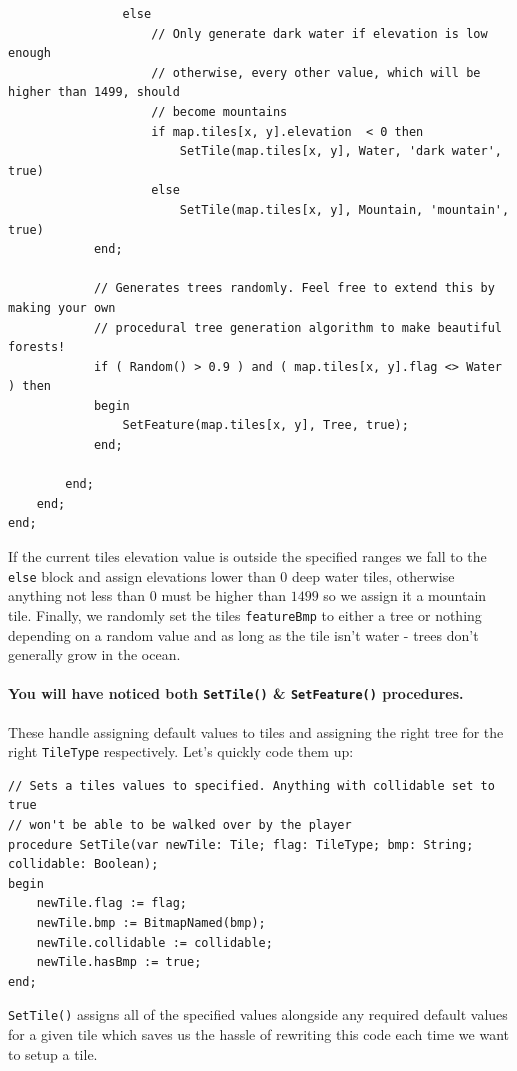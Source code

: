 \documentclass{article}
\begin{document}
\begin{verbatim}
				else
					// Only generate dark water if elevation is low enough
					// otherwise, every other value, which will be higher than 1499, should
					// become mountains
					if map.tiles[x, y].elevation  < 0 then
						SetTile(map.tiles[x, y], Water, 'dark water', true)
					else
						SetTile(map.tiles[x, y], Mountain, 'mountain', true)
			end;

			// Generates trees randomly. Feel free to extend this by making your own
			// procedural tree generation algorithm to make beautiful forests!
			if ( Random() > 0.9 ) and ( map.tiles[x, y].flag <> Water ) then
			begin
				SetFeature(map.tiles[x, y], Tree, true);
			end;

		end;
	end;
end;
\end{verbatim}

If the current tiles elevation value is outside the specified ranges we fall to the \texttt{else} block and assign elevations lower than $0$ deep water tiles, otherwise anything not less than $0$ must be higher than $1499$ so we assign it a mountain tile. Finally, we randomly set the tiles \texttt{featureBmp} to either a tree or nothing depending on a random value and as long as the tile isn't water - trees don't generally grow in the ocean.

\paragraph{You will have noticed both \texttt{SetTile()} \& \texttt{SetFeature()} procedures.} These handle assigning default values to tiles and assigning the right tree for the right \texttt{TileType} respectively. Let's quickly code them up:

\begin{verbatim}
// Sets a tiles values to specified. Anything with collidable set to true
// won't be able to be walked over by the player
procedure SetTile(var newTile: Tile; flag: TileType; bmp: String; collidable: Boolean);
begin
	newTile.flag := flag;
	newTile.bmp := BitmapNamed(bmp);
	newTile.collidable := collidable;
	newTile.hasBmp := true;
end;
\end{verbatim}

\texttt{SetTile()} assigns all of the specified values alongside any required default values for a given tile which saves us the hassle of rewriting this code each time we want to setup a tile.
\end{document}
